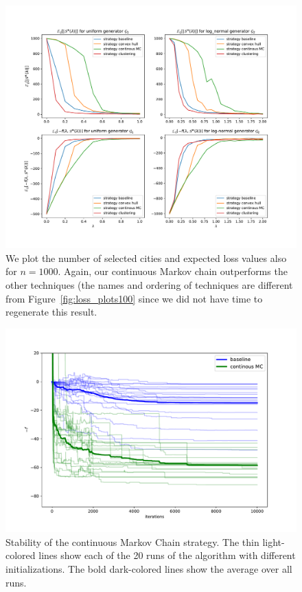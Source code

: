 \documentclass[conference,compsoc]{IEEEtran}
\begin{document}
\begin{figure}
    \centering
    \includegraphics[width=\linewidth, trim=55 55 55 55, clip]{images/Expectation_f_num_cities_1000.pdf}
    \caption{We plot the number of selected cities and expected loss values also for $n=1000$. Again, our continuous Markov chain outperforms the other techniques (the names and ordering of techniques are different from Figure~\ref{fig:loss_plots100} since we did not have time to regenerate this result. }
    \label{fig:loss_plots}
\end{figure}

\begin{figure}
    \centering
    \includegraphics[width=\linewidth]{images/stability.pdf}
    \caption{Stability of the continuous Markov Chain strategy. The thin light-colored lines show each of the 20 runs of the algorithm with different initializations. The bold dark-colored lines show the average over all runs.}
    \label{fig:stability}
\end{figure}
\end{document}
